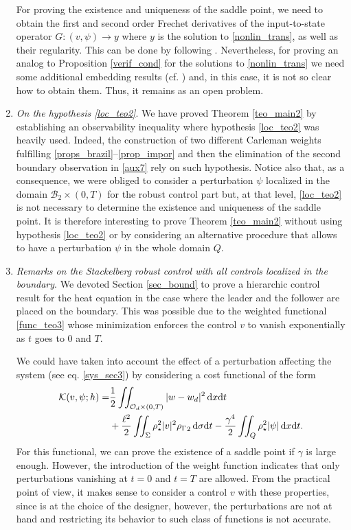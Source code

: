 \documentclass{dcds-bOF}
\theoremstyle{definition}
\def\csbd{\rho_{\Gamma}}
\def\dx{\,\textnormal{d}x}
\def\dt{\textnormal{d}t}
\def\d{\,\textnormal{d}}
\begin{document}
\begin{enumerate}
For proving the existence and uniqueness of the saddle point, we need to obtain the first and second order Frechet derivatives of the input-to-state operator $G:(v,\psi)\to y$ where $y$ is the solution to \eqref{nonlin_trans}, {as well as their regularity.} This can be done by following \cite{vhs_deT_rob}. Nevertheless, for proving an analog to Proposition \ref{verif_cond} for the solutions to \eqref{nonlin_trans} we need some additional embedding results (cf. \cite[Proof of Prop. 2]{vhs_deT_rob}) and, in this case, it is not so clear how to obtain them. Thus, it remains as an open problem.
%
\item \textit{On the hypothesis \eqref{loc_teo2}}. We have proved Theorem \ref{teo_main2} by establishing an observability inequality where hypothesis \eqref{loc_teo2} was heavily used. Indeed, the construction of two different Carleman weights fulfilling \eqref{props_brazil}--\eqref{prop_impor} and then the elimination of the second boundary observation in \eqref{aux7} rely on such hypothesis. Notice also that, as a consequence, we were obliged to consider a perturbation $\psi$ localized in the domain $\mathcal B_2\times(0,T)$ for the robust control part but, at that level, \eqref{loc_teo2} is not necessary to determine the existence and uniqueness of the saddle point. It is therefore interesting to prove Theorem \ref{teo_main2} without using hypothesis \eqref{loc_teo2} or by considering an alternative procedure that allows to have a perturbation $\psi$ in the whole domain $Q$.

\item \textit{Remarks on the Stackelberg robust control with all controls localized in the boundary}. We devoted Section \ref{sec_bound} to prove a hierarchic control result for the heat equation in the case where the leader and the follower are placed on the boundary. This was possible due to the weighted functional \eqref{func_teo3} whose minimization enforces the control $v$ to vanish exponentially as $t$ goes to $0$ and $T$.

We could have taken into account the effect of a perturbation affecting the system (see eq. \eqref{sys_sec3}) by considering a cost functional of the form
%
\begin{equation*}
\begin{split}
\mathcal K(v,\psi;h)=&\frac{1}{2}\iint_{\mathcal O_d\times(0,T)}|w-w_d|^2\dx\dt\\
&+\frac{\ell^2}{2}\iint_{\Sigma}\rho_\star^2|v|^2{\csbd}_2\d\sigma\dt-\frac{\gamma^4}{2}\iint_{Q}\rho_\star^2|\psi|\dx\dt.
\end{split}
\end{equation*}
%
For this functional, we can prove the existence of a saddle point if $\gamma$ is large enough. However, the introduction of the weight function indicates that only perturbations vanishing at $t=0$ and $t=T$ are allowed. From the practical point of view, it makes sense to consider a control $v$ with these properties, since is at the choice of the designer, however, the perturbations are not at hand and restricting its behavior to such class of functions is not accurate.


\end{enumerate}
\end{document}
